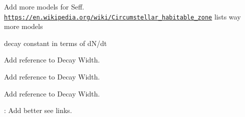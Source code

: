 
\begin{DoxyRefList}
\item[\label{todo__todo000001}%
\Hypertarget{todo__todo000001}%
Module \mbox{\hyperlink{group___e_g_x_phys-_circumstellar_habitable_zone_limit}{E\+G\+X\+Phys-\/\+Circumstellar\+Habitable\+Zone\+Limit}} ]Add more models for Seff. \href{https://en.wikipedia.org/wiki/Circumstellar_habitable_zone}{\tt https\+://en.\+wikipedia.\+org/wiki/\+Circumstellar\+\_\+habitable\+\_\+zone} lists way more models  
\item[\label{todo__todo000002}%
\Hypertarget{todo__todo000002}%
Module \mbox{\hyperlink{group___e_g_x_phys-_decay_constant}{E\+G\+X\+Phys-\/\+Decay\+Constant}} ]decay constant in terms of d\+N/dt  
\item[\label{todo__todo000003}%
\Hypertarget{todo__todo000003}%
Module \mbox{\hyperlink{group___e_g_x_phys-_half_life}{E\+G\+X\+Phys-\/\+Half\+Life}} ]Add reference to Decay Width.  
\item[\label{todo__todo000004}%
\Hypertarget{todo__todo000004}%
Module \mbox{\hyperlink{group___e_g_x_phys-_nuclear_binding_energy}{E\+G\+X\+Phys-\/\+Nuclear\+Binding\+Energy}} ]Add reference to Decay Width.  
\item[\label{todo__todo000006}%
\Hypertarget{todo__todo000006}%
Module \mbox{\hyperlink{group___e_g_x_phys-_semi_empirical_mass_formula}{E\+G\+X\+Phys-\/\+Semi\+Empirical\+Mass\+Formula}} ]Add reference to Decay Width.  
\item[\label{todo__todo000005}%
\Hypertarget{todo__todo000005}%
File \mbox{\hyperlink{_nuclear_separation_energy_8hpp}{Nuclear\+Separation\+Energy.hpp}} ]\+: Add better see links. 
\end{DoxyRefList}